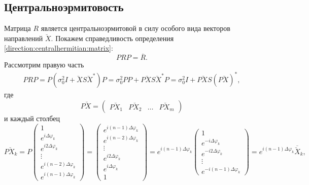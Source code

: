\subsection{Центральноэрмитовость}

Матрица $R$ является центральноэрмитовой в силу особого вида векторов направлений $\breve{X}$. Покажем справедливость определения
\eqref{direction:centralhermitian:matrix}:
\[
    P R P = \overline{R} .
\]
Рассмотрим правую часть
\begin{multline*}
    P R P
    = P \left ( \sigma_0^2 I + \breve{X} S \breve{X}^* \right ) P
    = \sigma_0^2 P P + P \breve{X} S \breve{X}^* P
    = \sigma_0^2 I + P \breve{X} S \left( P \breve{X} \right)^*,
\end{multline*}
где
\[
    P \breve{X}
    = \begin{pmatrix}
        P \breve{X}_1 & P \breve{X}_2 & \dots & P \breve{X}_m
    \end{pmatrix}
\]
и каждый столбец
\[
    P \breve{X}_k
    = P \begin{pmatrix}
        1                            \\
        e^{i \Delta \varphi_k}       \\
        e^{i 2 \Delta \varphi_k}     \\
        \vdots                       \\
        e^{i (n-2) \Delta \varphi_k} \\
        e^{i (n-1) \Delta \varphi_k}
    \end{pmatrix}
    = \begin{pmatrix}
        e^{i (n-1) \Delta \varphi_k} \\
        e^{i (n-2) \Delta \varphi_k} \\
        \vdots                       \\
        e^{i 2 \Delta \varphi_k}     \\
        e^{i \Delta \varphi_k}       \\
        1
    \end{pmatrix}
    = e^{i (n-1) \Delta \varphi_k}
    \begin{pmatrix}
        1                          \\
        e^{- i \Delta \varphi_k}   \\
        e^{- i 2 \Delta \varphi_k} \\
        \vdots                     \\
        e^{- i (n-1) \Delta \varphi_k}
    \end{pmatrix}
    = e^{i (n-1) \Delta \varphi_k} \overline{\breve{X}}_k ,
\]
